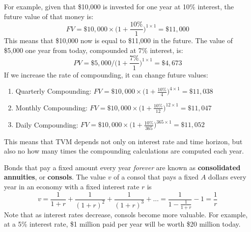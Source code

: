 \documentclass{article}
\begin{document}
    \begin{example}
      \label{ex:future-value-of-an-investment}
      For example, given that \$10,000 is invested for one year at 10\% interest, the future value of that money is: 
      \begin{equation}
        FV = \$10,000 \times \bigg(1 + \frac{10\%}{1}\bigg)^{1 \times 1} = \$11,000
      \end{equation}
      This means that \$10,000 now is equal to \$11,000 in the future. The value of \$5,000 one year from today, compounded at 7\% interest, is: 
      \begin{equation}
        PV = \$5,000 \bigg/ \bigg(1 + \frac{7\%}{1}\bigg)^{1 \times 1} =  \$4,673
      \end{equation}
      If we increase the rate of compounding, it can change future values: 
      \begin{enumerate}
          \item Quarterly Compounding: $FV = \$10,000 \times \Big( 1 + \frac{10\%}{4}\Big)^{4 \times 1} = \$11,038$
          \item Monthly Compounding: $FV = \$10,000 \times \Big( 1 + \frac{10\%}{12}\Big)^{12 \times 1} = \$11,047$
          \item Daily Compounding: $FV = \$10,000 \times \Big( 1 + \frac{10\%}{365}\Big)^{365 \times 1} = \$11,052$
      \end{enumerate}
      This means that TVM depends not only on interest rate and time horizon, but also no how many times the compounding calculations are computed each year. 
    \end{example}

    \begin{definition}[Consols]
      \label{def:consols}
      Bonds that pay a fixed amount every year \textit{forever} are known as \textbf{consolidated annuities}, or \textbf{consols}. The value $v$ of a consol that pays a fixed $A$ dollars every year in an economy with a fixed interest rate $r$ is 
      \begin{equation}
        v = \frac{1}{1+r} + \frac{1}{(1+r)^2} + \frac{1}{(1+r)^3} + \ldots  = \frac{1}{1 - \frac{1}{1+r}} - 1 = \frac{1}{r}
      \end{equation}
      Note that as interest rates decrease, consols become more valuable. For example, at a 5\% interest rate, \$1 million paid per year will be worth \$20 million today. 
    \end{definition}
\end{document}
